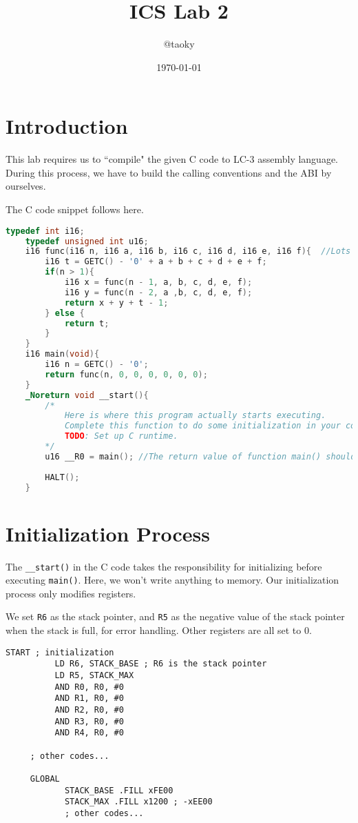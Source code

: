 \documentclass{article}
\title{ICS Lab 2}
\author{@taoky}
\date{\today}
\begin{document}
	\maketitle
	\section{Introduction}
	This lab requires us to ``compile" the given C code to LC-3 assembly language. During this process, we have to build the calling conventions and the ABI by ourselves.
	
	The C code snippet follows here.
	
	\begin{lstlisting}[language=c]
	typedef int i16;
	typedef unsigned int u16;
	i16 func(i16 n, i16 a, i16 b, i16 c, i16 d, i16 e, i16 f){  //Lots of arguments, hah?
	    i16 t = GETC() - '0' + a + b + c + d + e + f;
	    if(n > 1){
	        i16 x = func(n - 1, a, b, c, d, e, f);
	        i16 y = func(n - 2, a ,b, c, d, e, f);
	        return x + y + t - 1;
		} else {
			return t; 
		}
	}
	i16 main(void){
	    i16 n = GETC() - '0';
	    return func(n, 0, 0, 0, 0, 0, 0);
	}
	_Noreturn void __start(){
	    /*
	        Here is where this program actually starts executing.
	        Complete this function to do some initialization in your compiled assembly.
	        TODO: Set up C runtime.
	    */
	    u16 __R0 = main(); //The return value of function main() should be moved to R0.
	    
		HALT(); 
	}
	\end{lstlisting}
	\section{Initialization Process}
	The \texttt{\_\_start()} in the C code takes the responsibility for initializing before executing \texttt{main()}. Here, we won't write anything to memory. Our initialization process only modifies registers.
	
	We set \texttt{R6} as the stack pointer, and \texttt{R5} as the negative value of the stack pointer when the stack is full, for error handling. Other registers are all set to 0.
	
	\begin{lstlisting}[caption={Initialization code}]
	START ; initialization
	      LD R6, STACK_BASE ; R6 is the stack pointer
	      LD R5, STACK_MAX
	      AND R0, R0, #0
	      AND R1, R0, #0
	      AND R2, R0, #0
	      AND R3, R0, #0
	      AND R4, R0, #0
	      
	 ; other codes...
	 
	 GLOBAL 
	        STACK_BASE .FILL xFE00
	        STACK_MAX .FILL x1200 ; -xEE00
	        ; other codes...
	\end{lstlisting}
	
\end{document}
